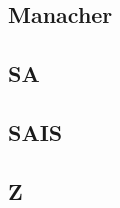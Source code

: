 \documentclass[a4paper,10pt,twocolumn,oneside]{article}
\begin{document}
\subsection{Manacher}


\subsection{SA}


\subsection{SAIS}


\subsection{Z}


%
\end{document}
